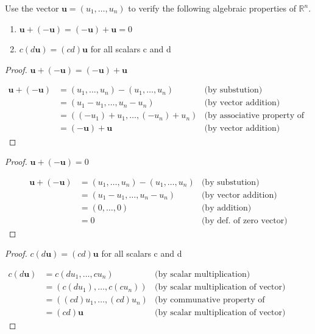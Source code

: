 \documentclass{../mathhomework}
\newcommand{\R}{\mathbb{R}}  %
\newcommand{\By}[1]{\text{(by #1)}}
\newcommand{\Vect}[1]{\pmb{#1}}
\begin{document}
\pagebreak
\begin{problem}[1.3\#34]
    Use the vector $\Vect{u} = (u_1, \ldots, u_n)$ to verify the following algebraic properties of $\R^n$.
    \begin{enumerate}[label=(\alph*)]
        \item $\Vect{u} + (-\Vect{u}) = (-\Vect{u}) + \Vect{u} = 0$
        \item $c(d\Vect{u}) = (cd)\Vect{u}$ for all scalars c and d
    \end{enumerate}

    \begin{solution}
        \begin{proof}
            $\Vect{u} + (-\Vect{u}) = (-\Vect{u}) + \Vect{u}$

            \begin{align*}
                \Vect{u} + (-\Vect{u}) & = (u_1, \ldots, u_n) - (u_1, \ldots, u_n) & \By{substution} \\
                & = (u_1 - u_1, \ldots, u_n - u_n) & \By{vector addition} \\
                & = ((-u_1) + u_1, \ldots, (-u_n) + u_n) & \By{associative property of addition} \\
                & = (-\Vect{u}) + \Vect{u} & \By{vector addition}
            \end{align*}
        \end{proof}

        \begin{proof}
            $\Vect{u} + (-\Vect{u}) = 0$

            \begin{align*}
                \Vect{u} + (-\Vect{u}) & = (u_1, \ldots, u_n) - (u_1, \ldots, u_n) & \By{substution} \\
                & = (u_1 - u_1, \ldots, u_n - u_n) & \By{vector addition} \\
                & = (0, \ldots, 0) & \By{addition} \\
                & = 0 & \By{def. of zero vector}
            \end{align*}
        \end{proof}

        \begin{proof}
            $c(d\Vect{u}) = (cd)\Vect{u}$ for all scalars c and d

            \begin{align*}
                c(d\Vect{u}) & = c(du_1, \ldots, cu_n) & \By{scalar multiplication} \\
                & = (c(du_1), \ldots, c(cu_n)) & \By{scalar multiplication of vector} \\
                & = ((cd)u_1, \ldots, (cd)u_n) & \By{communative property of multiplication} \\
                & = (cd)\Vect{u} & \By{scalar multiplication of vector}
            \end{align*}
        \end{proof}
    \end{solution}
\end{problem}
\end{document}

